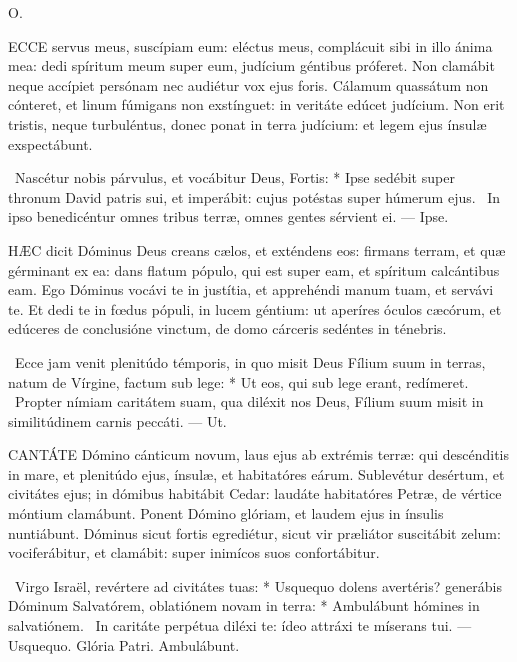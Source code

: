  O. 

\sectionornament




\lettrine[lines=2]{E}{CCE} servus meus, suscípiam eum: eléctus meus, complácuit sibi in illo ánima mea: dedi spíritum meum super eum, judícium géntibus próferet. Non clamábit neque accípiet persónam nec audiétur vox ejus foris. Cálamum quassátum non cónteret, et linum fúmigans non exstínguet: in veritáte edúcet judícium. Non erit tristis, neque turbuléntus, donec ponat in terra judícium: et legem ejus ínsulæ exspectábunt.

\R\ Nascétur nobis párvulus, et vocábitur Deus, Fortis: * Ipse sedébit super thronum David patris sui, et imperábit: cujus potéstas super húmerum ejus. \V\ In ipso benedicéntur omnes tribus terræ, omnes gentes sérvient ei. --- Ipse.


\lettrine[lines=2]{H}{ÆC} dicit Dóminus Deus creans cælos, et exténdens eos: firmans terram, et quæ gérminant ex ea: dans flatum pópulo, qui est super eam, et spíritum calcántibus eam. Ego Dóminus vocávi te in justítia, et apprehéndi manum tuam, et servávi te. Et dedi te in fœdus pópuli, in lucem géntium: ut aperíres óculos cæcórum, et edúceres de conclusióne vinctum, de domo cárceris sedéntes in ténebris.

\R\ Ecce jam venit plenitúdo témporis, in quo misit Deus Fílium suum in terras, natum de Vírgine, factum sub lege: * Ut eos, qui sub lege erant, redímeret. \V\ Propter nímiam caritátem suam, qua diléxit nos Deus, Fílium suum misit in similitúdinem carnis peccáti. --- Ut.


\lettrine[lines=2]{C}{ANTÁTE} Dómino cánticum novum, laus ejus ab extrémis terræ: qui descénditis in mare, et plenitúdo ejus, ínsulæ, et habitatóres eárum. Sublevétur desértum, et civitátes ejus; in dómibus habitábit Cedar: laudáte habitatóres Petræ, de vértice móntium clamábunt. Ponent Dómino glóriam, et laudem ejus in ínsulis nuntiábunt. Dóminus sicut fortis egrediétur, sicut vir præliátor suscitábit zelum: vociferábitur, et clamábit: super inimícos suos confortábitur.

\R\ Virgo Israël, revértere ad civitátes tuas: * Usquequo dolens avertéris? generábis Dóminum Salvatórem, oblatiónem novam in terra: * Ambulábunt hómines in salvatiónem. \V\ In caritáte perpétua diléxi te: ídeo attráxi te míserans tui. --- Usquequo. Glória Patri. Ambulábunt.

